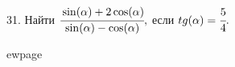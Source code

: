 31. Найти $\cfrac{\sin(\alpha)+2\cos(\alpha)}{\sin(\alpha)-\cos(\alpha)},$ если $tg(\alpha)=\cfrac{5}{4}.$

ewpage
